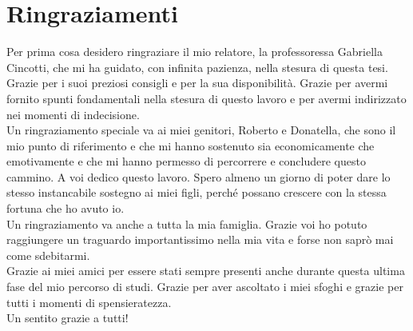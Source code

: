 \documentclass[../main.tex]{subfiles}
\begin{document}
\chapter*{Ringraziamenti}

Per prima cosa desidero ringraziare il mio relatore, la professoressa Gabriella Cincotti, che mi ha guidato, con infinita pazienza, nella stesura di questa tesi. Grazie per i suoi preziosi consigli e per la sua disponibilità. Grazie per avermi fornito spunti fondamentali nella stesura di questo lavoro e per avermi indirizzato nei momenti di indecisione.\\

\noindent Un ringraziamento speciale va ai miei genitori, Roberto e Donatella, che sono il mio punto di riferimento e che mi hanno sostenuto sia economicamente che emotivamente e che mi hanno permesso di percorrere e concludere questo cammino. A voi dedico questo lavoro. Spero almeno un giorno di poter dare lo stesso instancabile sostegno ai miei figli, perché possano crescere con la stessa fortuna che ho avuto io.\\

\noindent Un ringraziamento va anche a tutta la mia famiglia. Grazie voi ho potuto raggiungere un traguardo importantissimo nella mia vita e forse non saprò mai come sdebitarmi.\\

\noindent Grazie ai miei amici per essere stati sempre presenti anche durante questa ultima fase del mio percorso di studi. Grazie per aver ascoltato i miei sfoghi e grazie per tutti i momenti di spensieratezza.\\

\noindent Un sentito grazie a tutti!
\end{document}
